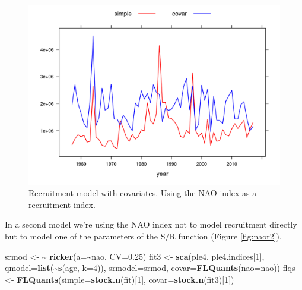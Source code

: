 \documentclass[
]{book}
\newenvironment{Shaded}{\begin{snugshade}}{\end{snugshade}}
\newcommand{\AttributeTok}[1]{\textcolor[rgb]{0.13,0.29,0.53}{#1}}
\newcommand{\DecValTok}[1]{\textcolor[rgb]{0.00,0.00,0.81}{#1}}
\newcommand{\ErrorTok}[1]{\textcolor[rgb]{0.64,0.00,0.00}{\textbf{#1}}}
\newcommand{\FloatTok}[1]{\textcolor[rgb]{0.00,0.00,0.81}{#1}}
\newcommand{\FunctionTok}[1]{\textcolor[rgb]{0.13,0.29,0.53}{\textbf{#1}}}
\newcommand{\NormalTok}[1]{#1}
\newcommand{\OtherTok}[1]{\textcolor[rgb]{0.56,0.35,0.01}{#1}}
\newcommand{\SpecialCharTok}[1]{\textcolor[rgb]{0.81,0.36,0.00}{\textbf{#1}}}
\begin{document}
\begin{figure}
\centering
\includegraphics{_bookdown_files/_main_files/figure-html/naor-1.png}
\caption{\label{fig:naor}Recruitment model with covariates. Using the NAO index as a recruitment index.}
\end{figure}

In a second model we're using the NAO index not to model recruitment directly but to model one of the parameters of the S/R function (Figure \ref{fig:naor2}).

\begin{Shaded}
\begin{Highlighting}[]
\NormalTok{srmod }\OtherTok{\textless{}{-}} \ErrorTok{\textasciitilde{}} \FunctionTok{ricker}\NormalTok{(}\AttributeTok{a=}\SpecialCharTok{\textasciitilde{}}\NormalTok{nao, }\AttributeTok{CV=}\FloatTok{0.25}\NormalTok{)}
\NormalTok{fit3 }\OtherTok{\textless{}{-}} \FunctionTok{sca}\NormalTok{(ple4, ple4.indices[}\DecValTok{1}\NormalTok{], }\AttributeTok{qmodel=}\FunctionTok{list}\NormalTok{(}\SpecialCharTok{\textasciitilde{}}\FunctionTok{s}\NormalTok{(age, }\AttributeTok{k=}\DecValTok{4}\NormalTok{)), }\AttributeTok{srmodel=}\NormalTok{srmod, }\AttributeTok{covar=}\FunctionTok{FLQuants}\NormalTok{(}\AttributeTok{nao=}\NormalTok{nao))}
\NormalTok{flqs }\OtherTok{\textless{}{-}} \FunctionTok{FLQuants}\NormalTok{(}\AttributeTok{simple=}\FunctionTok{stock.n}\NormalTok{(fit)[}\DecValTok{1}\NormalTok{], }\AttributeTok{covar=}\FunctionTok{stock.n}\NormalTok{(fit3)[}\DecValTok{1}\NormalTok{])}
\end{Highlighting}
\end{Shaded}
\end{document}

